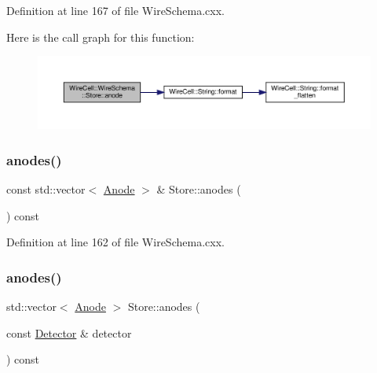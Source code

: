 Definition at line 167 of file Wire\+Schema.\+cxx.

Here is the call graph for this function\+:
\nopagebreak
\begin{figure}[H]
\begin{center}
\leavevmode
\includegraphics[width=350pt]{class_wire_cell_1_1_wire_schema_1_1_store_a65a9d9af1b336097f853185cf58f3ea0_cgraph}
\end{center}
\end{figure}
\mbox{\label{class_wire_cell_1_1_wire_schema_1_1_store_ae6049110bb1bd50009b1f9cf59b25557}} 
\subsubsection{\texorpdfstring{anodes()}{anodes()}\hspace{0.1cm}{\footnotesize\ttfamily [1/2]}}
{\footnotesize\ttfamily const std\+::vector$<$ \hyperlink{struct_wire_cell_1_1_wire_schema_1_1_anode}{Anode} $>$ \& Store\+::anodes (\begin{DoxyParamCaption}{ }\end{DoxyParamCaption}) const}



Definition at line 162 of file Wire\+Schema.\+cxx.

\mbox{\label{class_wire_cell_1_1_wire_schema_1_1_store_a26429e24e73daf38691e8f8aa940128e}} 
\subsubsection{\texorpdfstring{anodes()}{anodes()}\hspace{0.1cm}{\footnotesize\ttfamily [2/2]}}
{\footnotesize\ttfamily std\+::vector$<$ \hyperlink{struct_wire_cell_1_1_wire_schema_1_1_anode}{Anode} $>$ Store\+::anodes (\begin{DoxyParamCaption}\item[{const \hyperlink{struct_wire_cell_1_1_wire_schema_1_1_detector}{Detector} \&}]{detector }\end{DoxyParamCaption}) const}



